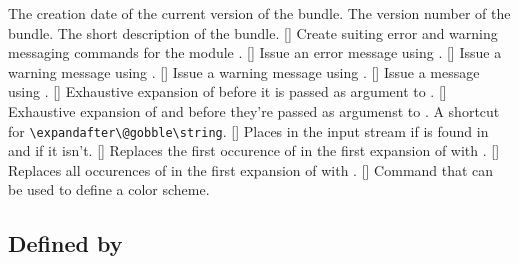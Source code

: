 \documentclass[load-preamble]{cnltx-doc}
\makeatletter
\def\cnltxexample{\cnltx@package@name@format{cnltx-example}}
\makeatother
\begin{document}
\begin{commands}
    The creation date of the current version of the bundle.
    The version number of the bundle.
    The short description of the bundle.
    []
    Create suiting error and warning messaging commands for the module
    .
  []
    Issue an error message using .
  []
    Issue a warning message using .
    []
    Issue a warning message using .
  []
    Issue a message using .
  []
    Exhaustive expansion of  before it is passed as argument to
    .
  []
    Exhaustive expansion of  and  before
    they're passed as argumenst to .
    A shortcut for \lstinline[style=cnltx]+\expandafter\@gobble\string+.
  []
    Places  in the input stream if  is found in
     and  if it isn't.
  []
    Replaces the first occurence of  in the first expansion of
     with .
  []
    Replaces all occurences of  in the first expansion of
     with .
  []
    Command that can be used to define a color scheme.
\end{commands}

\subsection{Defined by \cnltxexample}
\end{document}

